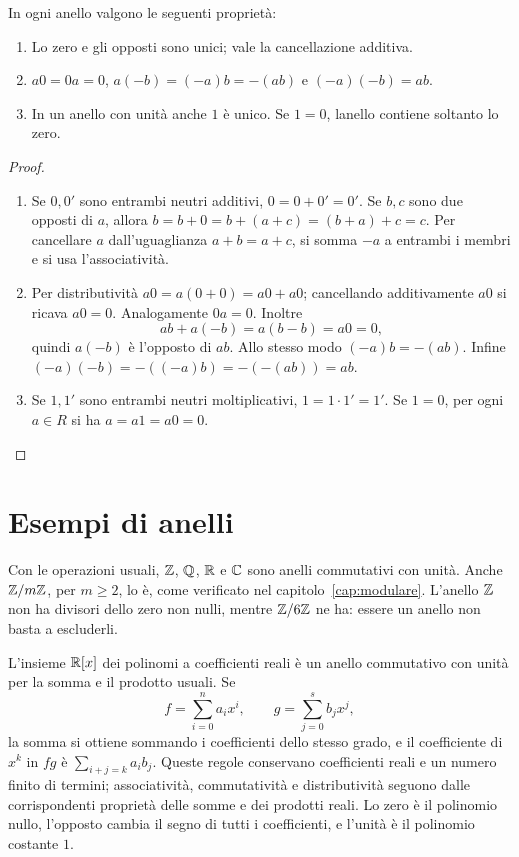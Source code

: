 \begin{proposizione}\label{prop:prime-anello}
In ogni anello valgono le seguenti proprietà:
\begin{enumerate}[label=\arabic*.]
\item Lo zero e gli opposti sono unici; vale la cancellazione additiva.
\item $a0=0a=0$, $a(-b)=(-a)b=-(ab)$ e $(-a)(-b)=ab$.
\item In un anello con unità anche $1$ è unico. Se $1=0$, l\textquotesingle anello contiene soltanto lo zero.
\end{enumerate}
\end{proposizione}
\begin{proof}
\begin{enumerate}[label=\arabic*.]
\item Se $0,0'$ sono entrambi neutri additivi, $0=0+0'=0'$. Se $b,c$ sono due opposti di $a$, allora $b=b+0=b+(a+c)=(b+a)+c=c$. Per cancellare $a$ dall'uguaglianza $a+b=a+c$, si somma $-a$ a entrambi i membri e si usa l'associatività.
\item Per distributività $a0=a(0+0)=a0+a0$; cancellando additivamente $a0$ si ricava $a0=0$. Analogamente $0a=0$. Inoltre
\[
ab+a(-b)=a(b-b)=a0=0,
\]
quindi $a(-b)$ è l'opposto di $ab$. Allo stesso modo $(-a)b=-(ab)$. Infine $(-a)(-b)=-((-a)b)=-(-(ab))=ab$.
\item Se $1,1'$ sono entrambi neutri moltiplicativi, $1=1\cdot1'=1'$. Se $1=0$, per ogni $a\in R$ si ha $a=a1=a0=0$.
\end{enumerate}
\end{proof}

\section{Esempi di anelli}
\begin{esempio}
Con le operazioni usuali, $\mathbb{Z}$, $\mathbb{Q}$, $\mathbb{R}$ e $\mathbb{C}$ sono anelli commutativi con unità. Anche $\mathbb{Z}/m\mathbb{Z}$, per $m\ge2$, lo è, come verificato nel capitolo~\ref{cap:modulare}. L'anello $\mathbb{Z}$ non ha divisori dello zero non nulli, mentre $\mathbb{Z}/6\mathbb{Z}$ ne ha: essere un anello non basta a escluderli.
\end{esempio}

\begin{esempio}
L'insieme $\mathbb{R}[x]$ dei polinomi a coefficienti reali è un anello commutativo con unità per la somma e il prodotto usuali. Se
\[
f=\sum_{i=0}^n a_ix^i,\qquad g=\sum_{j=0}^s b_jx^j,
\]
la somma si ottiene sommando i coefficienti dello stesso grado, e il coefficiente di $x^k$ in $fg$ è $\sum_{i+j=k}a_ib_j$. Queste regole conservano coefficienti reali e un numero finito di termini; associatività, commutatività e distributività seguono dalle corrispondenti proprietà delle somme e dei prodotti reali. Lo zero è il polinomio nullo, l'opposto cambia il segno di tutti i coefficienti, e l'unità è il polinomio costante $1$.
\end{esempio}

